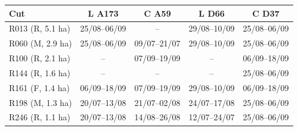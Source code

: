 \begin{tabular}{lcccc}
\toprule
Cut & L A173 & C A59 & L D66 & C D37 \\
\midrule
R013 (R, 5.1 ha) & 25/08--06/09 & -- & 29/08--10/09 & 25/08--06/09 \\
R060 (M, 2.9 ha) & 25/08--06/09 & 09/07--21/07 & 29/08--10/09 & 25/08--06/09 \\
R100 (R, 2.1 ha) & -- & 07/09--19/09 & -- & 06/09--18/09 \\
R144 (R, 1.6 ha) & -- & -- & -- & 25/08--06/09 \\
R161 (F, 1.4 ha) & 06/09--18/09 & 07/09--19/09 & 29/08--10/09 & 06/09--18/09 \\
R198 (M, 1.3 ha) & 20/07--13/08 & 21/07--02/08 & 24/07--17/08 & 25/08--06/09 \\
R246 (R, 1.1 ha) & 20/07--13/08 & 14/08--26/08 & 12/07--24/07 & 25/08--06/09 \\
\bottomrule
\end{tabular}
